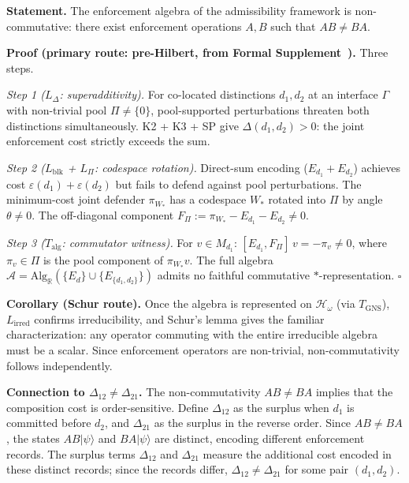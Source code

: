 \documentclass[11pt]{article}
\begin{document}
\begin{tcolorbox}[apfbox, title={Lemma $L_{\Delta\to\mathrm{nc}}$ (Interference Non-Closure Implies Non-Commutativity)}]
\textbf{Statement.}  The enforcement algebra of the admissibility framework is non-commutative: there exist enforcement operations $A, B$ such that $AB \ne BA$.

\smallskip\noindent\textbf{Proof (primary route: pre-Hilbert, from Formal Supplement~\cite{BrookeSupplement}).}  Three steps.

\textit{Step 1 ($L_\Delta$: superadditivity).}  For co-located distinctions $d_1, d_2$ at an interface $\Gamma$ with non-trivial pool $\Pi \ne \{0\}$, pool-supported perturbations threaten both distinctions simultaneously.  K2 + K3 + SP give $\Delta(d_1, d_2) > 0$: the joint enforcement cost strictly exceeds the sum.

\textit{Step 2 ($L_{\mathrm{blk}}$ + $L_\Pi$: codespace rotation).}  Direct-sum encoding ($E_{d_1} + E_{d_2}$) achieves cost $\varepsilon(d_1) + \varepsilon(d_2)$ but fails to defend against pool perturbations.  The minimum-cost joint defender $\pi_{W_*}$ has a codespace $W_*$ rotated into $\Pi$ by angle $\theta \ne 0$.  The off-diagonal component $F_\Pi := \pi_{W_*} - E_{d_1} - E_{d_2} \ne 0$.

\textit{Step 3 ($T_{\mathrm{alg}}$: commutator witness).}  For $v \in M_{d_1}$: $[E_{d_1}, F_\Pi]\,v = -\pi_v \ne 0$, where $\pi_v \in \Pi$ is the pool component of $\pi_{W_*} v$.  The full algebra $\mathcal{A} = \mathrm{Alg}_\mathbb{R}(\{E_d\} \cup \{E_{\{d_1,d_2\}}\})$ admits no faithful commutative $*$-representation.  $\square$

\smallskip\noindent\textbf{Corollary (Schur route).}  Once the algebra is represented on $\mathcal{H}_\omega$ (via $T_{\mathrm{GNS}}$), $L_{\mathrm{irred}}$ confirms irreducibility, and Schur's lemma gives the familiar characterization: any operator commuting with the entire irreducible algebra must be a scalar.  Since enforcement operators are non-trivial, non-commutativity follows independently.

\smallskip\noindent\textbf{Connection to $\Delta_{12} \ne \Delta_{21}$.}  The non-commutativity $AB \ne BA$ implies that the composition cost is order-sensitive.  Define $\Delta_{12}$ as the surplus when $d_1$ is committed before $d_2$, and $\Delta_{21}$ as the surplus in the reverse order.  Since $AB \ne BA$, the states $AB|\psi\rangle$ and $BA|\psi\rangle$ are distinct, encoding different enforcement records.  The surplus terms $\Delta_{12}$ and $\Delta_{21}$ measure the additional cost encoded in these distinct records; since the records differ, $\Delta_{12} \ne \Delta_{21}$ for some pair $(d_1, d_2)$.


\end{tcolorbox}
\end{document}
